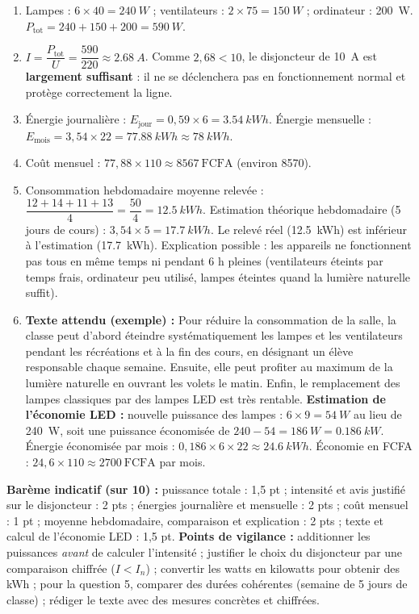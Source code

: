 \documentclass[11pt]{article}
\begin{document}
\begin{corrige}
\begin{enumerate}
\item Lampes : $6 \times 40 = \SI{240}{W}$ ; ventilateurs : $2 \times 75 = \SI{150}{W}$ ; ordinateur : \SI{200}{W}.
$P_{\text{tot}} = 240 + 150 + 200 = \SI{590}{W}$.
\item $I = \dfrac{P_{\text{tot}}}{U} = \dfrac{590}{220} \approx \SI{2,68}{A}$.
Comme $2,68 < 10$, le disjoncteur de \SI{10}{A} est \textbf{largement suffisant} : il ne se déclenchera pas en fonctionnement normal et protège correctement la ligne.
\item Énergie journalière : $E_{\text{jour}} = 0,59 \times 6 = \SI{3,54}{kWh}$.
Énergie mensuelle : $E_{\text{mois}} = 3,54 \times 22 = \SI{77,88}{kWh} \approx \SI{78}{kWh}$.
\item Coût mensuel : $77,88 \times 110 \approx \SI{8567}{\text{FCFA}}$ (environ \SI{8570}{}).
\item Consommation hebdomadaire moyenne relevée : $\dfrac{12 + 14 + 11 + 13}{4} = \dfrac{50}{4} = \SI{12,5}{kWh}$.
Estimation théorique hebdomadaire (5 jours de cours) : $3,54 \times 5 = \SI{17,7}{kWh}$.
Le relevé réel (\SI{12,5}{kWh}) est inférieur à l'estimation (\SI{17,7}{kWh}). Explication possible : les appareils ne fonctionnent pas tous en même temps ni pendant 6 h pleines (ventilateurs éteints par temps frais, ordinateur peu utilisé, lampes éteintes quand la lumière naturelle suffit).
\item \textbf{Texte attendu (exemple) :} Pour réduire la consommation de la salle, la classe peut d'abord éteindre systématiquement les lampes et les ventilateurs pendant les récréations et à la fin des cours, en désignant un élève responsable chaque semaine. Ensuite, elle peut profiter au maximum de la lumière naturelle en ouvrant les volets le matin. Enfin, le remplacement des lampes classiques par des lampes LED est très rentable.
\textbf{Estimation de l'économie LED :} nouvelle puissance des lampes : $6 \times 9 = \SI{54}{W}$ au lieu de \SI{240}{W}, soit une puissance économisée de $240 - 54 = \SI{186}{W} = \SI{0,186}{kW}$.
Énergie économisée par mois : $0,186 \times 6 \times 22 \approx \SI{24,6}{kWh}$.
Économie en FCFA : $24,6 \times 110 \approx \SI{2700}{\text{FCFA}}$ par mois.
\end{enumerate}
\textbf{Barème indicatif (sur 10) :} puissance totale : 1,5 pt ; intensité et avis justifié sur le disjoncteur : 2 pts ; énergies journalière et mensuelle : 2 pts ; coût mensuel : 1 pt ; moyenne hebdomadaire, comparaison et explication : 2 pts ; texte et calcul de l'économie LED : 1,5 pt.
\textbf{Points de vigilance :} additionner les puissances \emph{avant} de calculer l'intensité ; justifier le choix du disjoncteur par une comparaison chiffrée ($I < I_n$) ; convertir les watts en kilowatts pour obtenir des kWh ; pour la question 5, comparer des durées cohérentes (semaine de 5 jours de classe) ; rédiger le texte avec des mesures concrètes et chiffrées.
\end{corrige}
\end{document}
